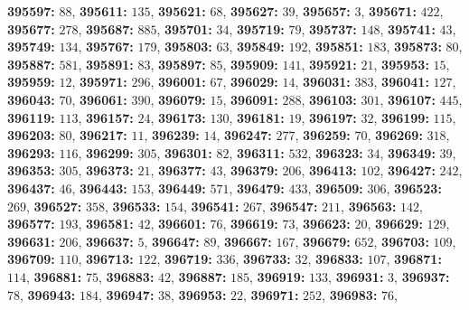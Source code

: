 \textsf{\bfseries 395597:} $88$, \textsf{\bfseries 395611:} $135$, \textsf{\bfseries 395621:} $68$, \textsf{\bfseries 395627:} $39$, \textsf{\bfseries 395657:} $3$, \textsf{\bfseries 395671:} $422$, \textsf{\bfseries 395677:} $278$, \textsf{\bfseries 395687:} $885$, \textsf{\bfseries 395701:} $34$, \textsf{\bfseries 395719:} $79$, \textsf{\bfseries 395737:} $148$, \textsf{\bfseries 395741:} $43$, \textsf{\bfseries 395749:} $134$, \textsf{\bfseries 395767:} $179$, \textsf{\bfseries 395803:} $63$, \textsf{\bfseries 395849:} $192$, \textsf{\bfseries 395851:} $183$, \textsf{\bfseries 395873:} $80$, \textsf{\bfseries 395887:} $581$, \textsf{\bfseries 395891:} $83$, \textsf{\bfseries 395897:} $85$, \textsf{\bfseries 395909:} $141$, \textsf{\bfseries 395921:} $21$, \textsf{\bfseries 395953:} $15$, \textsf{\bfseries 395959:} $12$, \textsf{\bfseries 395971:} $296$, \textsf{\bfseries 396001:} $67$, \textsf{\bfseries 396029:} $14$, \textsf{\bfseries 396031:} $383$, \textsf{\bfseries 396041:} $127$, \textsf{\bfseries 396043:} $70$, \textsf{\bfseries 396061:} $390$, \textsf{\bfseries 396079:} $15$, \textsf{\bfseries 396091:} $288$, \textsf{\bfseries 396103:} $301$, \textsf{\bfseries 396107:} $445$, \textsf{\bfseries 396119:} $113$, \textsf{\bfseries 396157:} $24$, \textsf{\bfseries 396173:} $130$, \textsf{\bfseries 396181:} $19$, \textsf{\bfseries 396197:} $32$, \textsf{\bfseries 396199:} $115$, \textsf{\bfseries 396203:} $80$, \textsf{\bfseries 396217:} $11$, \textsf{\bfseries 396239:} $14$, \textsf{\bfseries 396247:} $277$, \textsf{\bfseries 396259:} $70$, \textsf{\bfseries 396269:} $318$, \textsf{\bfseries 396293:} $116$, \textsf{\bfseries 396299:} $305$, \textsf{\bfseries 396301:} $82$, \textsf{\bfseries 396311:} $532$, \textsf{\bfseries 396323:} $34$, \textsf{\bfseries 396349:} $39$, \textsf{\bfseries 396353:} $305$, \textsf{\bfseries 396373:} $21$, \textsf{\bfseries 396377:} $43$, \textsf{\bfseries 396379:} $206$, \textsf{\bfseries 396413:} $102$, \textsf{\bfseries 396427:} $242$, \textsf{\bfseries 396437:} $46$, \textsf{\bfseries 396443:} $153$, \textsf{\bfseries 396449:} $571$, \textsf{\bfseries 396479:} $433$, \textsf{\bfseries 396509:} $306$, \textsf{\bfseries 396523:} $269$, \textsf{\bfseries 396527:} $358$, \textsf{\bfseries 396533:} $154$, \textsf{\bfseries 396541:} $267$, \textsf{\bfseries 396547:} $211$, \textsf{\bfseries 396563:} $142$, \textsf{\bfseries 396577:} $193$, \textsf{\bfseries 396581:} $42$, \textsf{\bfseries 396601:} $76$, \textsf{\bfseries 396619:} $73$, \textsf{\bfseries 396623:} $20$, \textsf{\bfseries 396629:} $129$, \textsf{\bfseries 396631:} $206$, \textsf{\bfseries 396637:} $5$, \textsf{\bfseries 396647:} $89$, \textsf{\bfseries 396667:} $167$, \textsf{\bfseries 396679:} $652$, \textsf{\bfseries 396703:} $109$, \textsf{\bfseries 396709:} $110$, \textsf{\bfseries 396713:} $122$, \textsf{\bfseries 396719:} $336$, \textsf{\bfseries 396733:} $32$, \textsf{\bfseries 396833:} $107$, \textsf{\bfseries 396871:} $114$, \textsf{\bfseries 396881:} $75$, \textsf{\bfseries 396883:} $42$, \textsf{\bfseries 396887:} $185$, \textsf{\bfseries 396919:} $133$, \textsf{\bfseries 396931:} $3$, \textsf{\bfseries 396937:} $78$, \textsf{\bfseries 396943:} $184$, \textsf{\bfseries 396947:} $38$, \textsf{\bfseries 396953:} $22$, \textsf{\bfseries 396971:} $252$, \textsf{\bfseries 396983:} $76$, 
